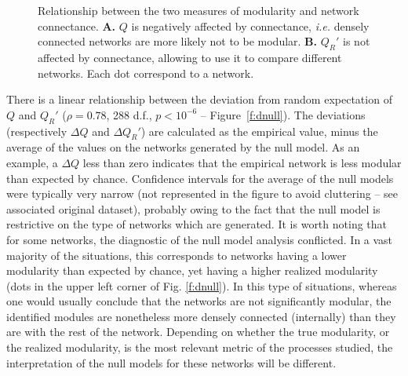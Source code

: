 \documentclass[12pt,oneside]{article}
\begin{document}
\begin{figure}[tbp]
\begin{center}
%		
\end{center}
\caption{Relationship between the two measures of modularity and network connectance. \textbf{A.} $Q$ is negatively affected by connectance, \emph{i.e.} densely connected networks are more likely not to be modular. \textbf{B.} $Q_R'$ is not affected by connectance, allowing to use it to compare different networks. Each dot correspond to a network.}
\label{f:co}
\end{figure}

There is a linear relationship between the deviation from random
expectation of $Q$ and $Q_R'$ ($\rho = 0.78$, 288 d.f., $p < 10^{-6}$
-- Figure~\ref{f:dnull}). The deviations (respectively $\Delta Q$ and
$\Delta Q_R'$) are calculated as the empirical value, minus the average
of the values on the networks generated by the null model. As an example,
a $\Delta Q$ less than zero indicates that the empirical network is less
modular than expected by chance. Confidence intervals for the average of
the null models were typically very narrow (not represented in the figure to
avoid cluttering -- see associated original dataset), probably owing to the
fact that the null model is restrictive on the type of networks which are
generated. It is worth noting that for some networks, the diagnostic of the
null model analysis conflicted.  In a vast majority of the situations, this
corresponds to networks having a lower modularity than expected by chance,
yet having a higher realized modularity (dots in the upper left corner of
Fig. \ref{f:dnull}). In this type of situations, whereas one would usually
conclude that the networks are not significantly modular, the identified
modules are nonetheless more densely connected (internally) than they are
with the rest of the network. Depending on whether the true modularity, or
the realized modularity, is the most relevant metric of the processes studied,
the interpretation of the null models for these networks will be different.
\end{document}
